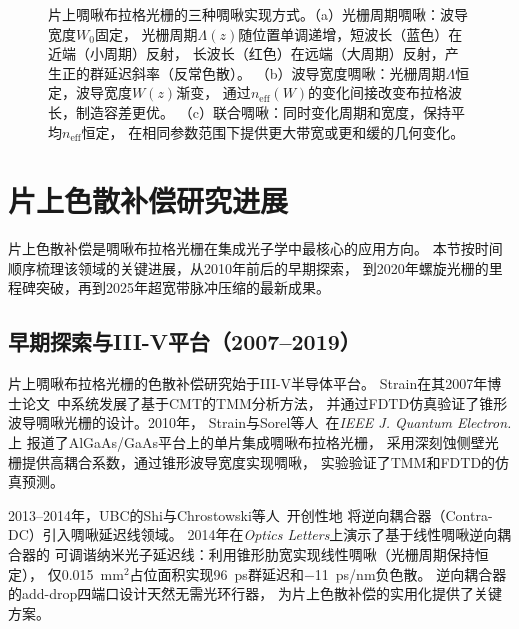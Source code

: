 \documentclass[12pt,a4paper,twoside]{article}
\begin{document}
\begin{figure}[p]
\caption{片上啁啾布拉格光栅的三种啁啾实现方式。（a）光栅周期啁啾：波导宽度$W_0$固定，
光栅周期$\Lambda(z)$随位置单调递增，短波长（蓝色）在近端（小周期）反射，
长波长（红色）在远端（大周期）反射，产生正的群延迟斜率（反常色散）。
（b）波导宽度啁啾：光栅周期$\Lambda$恒定，波导宽度$W(z)$渐变，
通过$n_{\text{eff}}(W)$的变化间接改变布拉格波长，制造容差更优。
（c）联合啁啾：同时变化周期和宽度，保持平均$n_{\text{eff}}$恒定，
在相同参数范围下提供更大带宽或更和缓的几何变化。}
\label{fig:chirp_methods}
\end{figure}

\newpage

\section{片上色散补偿研究进展}

片上色散补偿是啁啾布拉格光栅在集成光子学中最核心的应用方向。
本节按时间顺序梳理该领域的关键进展，从2010年前后的早期探索，
到2020年螺旋光栅的里程碑突破，再到2025年超宽带脉冲压缩的最新成果。

\subsection{早期探索与III-V平台（2007--2019）}

片上啁啾布拉格光栅的色散补偿研究始于III-V半导体平台。
Strain在其2007年博士论文~\cite{strain2007}中系统发展了基于CMT的TMM分析方法，
并通过FDTD仿真验证了锥形波导啁啾光栅的设计。2010年，
Strain与Sorel等人~\cite{strain2010}在\textit{IEEE J. Quantum Electron.}上
报道了AlGaAs/GaAs平台上的单片集成啁啾布拉格光栅，
采用深刻蚀侧壁光栅提供高耦合系数，通过锥形波导宽度实现啁啾，
实验验证了TMM和FDTD的仿真预测。

2013--2014年，UBC的Shi与Chrostowski等人~\cite{shi2013,shi2014}开创性地
将逆向耦合器（Contra-DC）引入啁啾延迟线领域。
2014年在\textit{Optics Letters}上演示了基于线性啁啾逆向耦合器的
可调谐纳米光子延迟线：利用锥形肋宽实现线性啁啾（光栅周期保持恒定），
仅0.015~mm$^2$占位面积实现96~ps群延迟和$-$11~ps/nm负色散。
逆向耦合器的add-drop四端口设计天然无需光环行器，
为片上色散补偿的实用化提供了关键方案。
\end{document}
